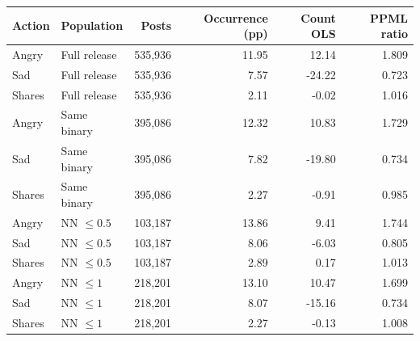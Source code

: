 \begin{tabular}{llrrrr}
\toprule
Action & Population & Posts & Occurrence (pp) & Count OLS & PPML ratio \\
\midrule
Angry & Full release & 535,936 & 11.95 & 12.14 & 1.809 \\
Sad & Full release & 535,936 & 7.57 & -24.22 & 0.723 \\
Shares & Full release & 535,936 & 2.11 & -0.02 & 1.016 \\
Angry & Same binary & 395,086 & 12.32 & 10.83 & 1.729 \\
Sad & Same binary & 395,086 & 7.82 & -19.80 & 0.734 \\
Shares & Same binary & 395,086 & 2.27 & -0.91 & 0.985 \\
Angry & NN $\leq0.5$ & 103,187 & 13.86 & 9.41 & 1.744 \\
Sad & NN $\leq0.5$ & 103,187 & 8.06 & -6.03 & 0.805 \\
Shares & NN $\leq0.5$ & 103,187 & 2.89 & 0.17 & 1.013 \\
Angry & NN $\leq1$ & 218,201 & 13.10 & 10.47 & 1.699 \\
Sad & NN $\leq1$ & 218,201 & 8.07 & -15.16 & 0.734 \\
Shares & NN $\leq1$ & 218,201 & 2.27 & -0.13 & 1.008 \\
\bottomrule
\end{tabular}
